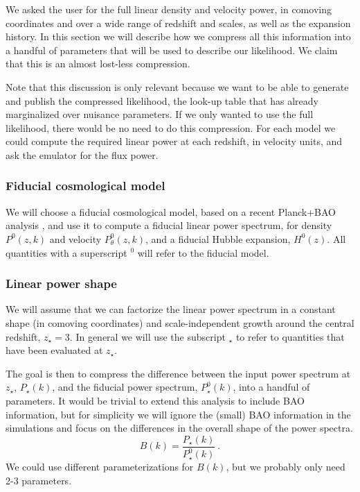 We asked the user for the full linear density and velocity power, in
comoving coordinates and over a wide range of redshift and scales,
as well as the expansion history.
In this section we will describe how we compress all this information into
a handful of parameters that will be used to describe our likelihood.
We claim that this is an almost lost-less compression.

Note that this discussion is only relevant because we want to be able
to generate and publish the compressed likelihood, the look-up table that has
already marginalized over nuisance parameters.
If we only wanted to use the full likelihood, there would be no need to
do this compression.
For each model we could compute the required linear power at each redshift,
in velocity units, and ask the emulator for the flux power.

\subsubsection{Fiducial cosmological model}
 
We will choose a fiducial cosmological model, based on a recent Planck+BAO
analysis \cite{Planck2015}, and use it to compute a fiducial linear power
spectrum, for density $P^0(z,k)$ and velocity $P_\theta^0(z,k)$, and a
fiducial Hubble expansion, $H^0(z)$.
All quantities with a superscript $^0$ will refer to the fiducial model.

\subsubsection{Linear power shape}

We will assume that we can factorize the linear power spectrum in a 
constant shape (in comoving coordinates) and scale-independent growth 
around the central redshift, $z_\star=3$. 
In general we will use the subscript $_\star$ to refer to quantities that 
have been evaluated at $z_\star$.

The goal is then to compress the difference between the input power spectrum
at $z_\star$, $P_\star(k)$, and the fiducial power spectrum, $P_\star^0(k)$, 
into a handful of parameters.
It would be trivial to extend this analysis to include BAO information, but
for simplicity we will ignore the (small) BAO information in the simulations
and focus on the differences in the overall shape of the power spectra.
\begin{equation}
 B(k) = \frac{P_\star(k)}{P_\star^0(k)} ~. 
\end{equation}
We could use different parameterizations for $B(k)$, but we probably only
need 2-3 parameters.

